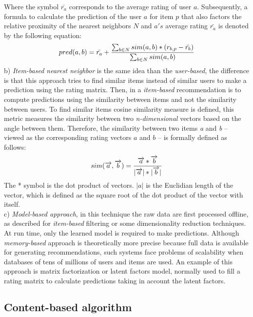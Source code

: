 Where the symbol $\bar{r_a}$ corresponds to the average rating of user
$a$. Subsequently, a formula to calculate the prediction of the user
$a$ for item $p$ that also factors the relative proximity of the
nearest neighbors $N$ and $a's$ average rating $\bar{r_a}$ is denoted
by the following equation:
\begin{equation}\label{eq:prediction}
\displaystyle pred(a,b) = \bar{r_a} + 
{\sum_{b \in N} sim(a,b) * (r_{b,p}- \bar{r_b}) 
\over \sum_{b \in N} sim(a,b)} 
\end{equation}
b) \textit{Item-based nearest neighbor} is the same idea than the \textit
{user-based}, the difference is that this approach tries to find
similar items instead of similar users to make a prediction using the rating
matrix.  Then, in a \textit{item-based} recommendation is to compute
predictions using the similarity between items and not the similarity
between users.  To find similar items cosine similarity measure is
defined, this metric measures the similarity between two
\textit{n-dimensional} vectors based on the angle between them.
Therefore, the similarity between two items \textit{a} and \textit{b}
– viewed as the corresponding rating vectors $a$ and $b$ – is formally
defined as follows:
\begin{equation}\label{eq:cosine}
\displaystyle sim(\overrightarrow{a},\overrightarrow{b})= 
{\overrightarrow{a}* \overrightarrow{b} \over
|\overrightarrow{a}|*|\overrightarrow{b}| }
\end{equation}
The * symbol is the dot product of vectors. $|a|$ is the Euclidian
length of the vector, which is defined as the square root of the dot
product of the vector with itself.\\ 
c) \textit{Model-based approach}, in this technique  the raw data are
first processed offline, as described for \textit {item-based}
filtering or some dimensionality reduction techniques. At run time,
only the learned model is required to make predictions. Although
\textit{memory-based} approach is theoretically more precise because
full data is available for generating recommendations, such systems
face problems of scalability when databases of tens of millions of
users and items are used. An example of this approach is matrix
factorization or latent factors model, normally used to fill a rating
matrix to calculate predictions taking in account the latent factors.

\subsection{Content-based algorithm}

